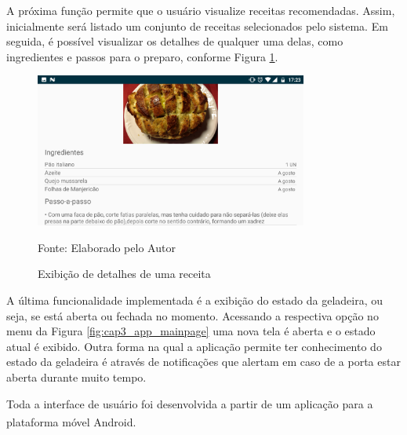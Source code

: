 A próxima função permite que o usuário visualize receitas recomendadas. Assim, inicialmente será listado um conjunto de receitas selecionados pelo sistema. Em seguida, é possível visualizar os detalhes de qualquer uma delas, como ingredientes e passos para o preparo, conforme Figura \ref{fig:cap4_exibicao_receita}.

\begin{figure}[htb]
    \caption{Exibição de detalhes de uma receita}
    \label{fig:cap4_exibicao_receita}
    \includegraphics[width=0.8\textwidth]{figuras/cap4_exibicao_receita.png}
    
   \footnotesize{Fonte: Elaborado pelo Autor}
\end{figure}

A última funcionalidade implementada é a exibição do estado da geladeira, ou seja, se está aberta ou fechada no momento. Acessando a respectiva opção no menu da Figura \ref{fig:cap3_app_mainpage} uma nova tela é aberta e o estado atual é exibido. Outra forma na qual a aplicação permite ter conhecimento do estado da geladeira é através de notificações que alertam em caso de a porta estar aberta durante muito tempo.

Toda a interface de usuário foi desenvolvida a partir de um aplicação para a plataforma móvel Android\textsuperscript{\textregistered}.



